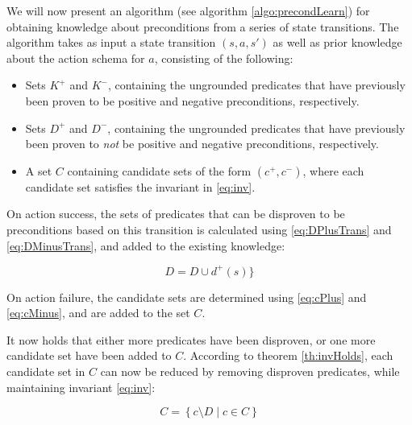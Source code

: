 \documentclass[../../Master.tex]{subfiles}
\begin{document}
    
We will now present an algorithm (see algorithm \ref{algo:precondLearn}) for obtaining knowledge about preconditions from a series of state transitions. The algorithm takes as input a state transition $(s, a, s')$ as well as prior knowledge about the action schema for $a$, consisting of the following:

\begin{itemize}
    \item Sets $K^+$ and $K^-$, containing the ungrounded predicates that have previously been proven to be positive and negative preconditions, respectively.
    \item Sets $D^+$ and $D^-$, containing the ungrounded predicates that have previously been proven to \textit{not} be positive and negative preconditions, respectively.
    \item A set $C$ containing candidate sets of the form $\left(c^+, c^- \right)$, where each candidate set satisfies the invariant in \eqref{eq:inv}.
\end{itemize}

On action success, the sets of predicates that can be disproven to be preconditions based on this transition is calculated using \eqref{eq:DPlusTrans} and \eqref{eq:DMinusTrans}, and added to the existing knowledge:

\begin{equation*}
    D = D \cup d^+(s)\}
\end{equation*}

%

On action failure, the candidate sets are determined using \eqref{eq:cPlus} and \eqref{eq:cMinus}, and are added to the set $C$.

It now holds that either more predicates have been disproven, or one more candidate set have been added to $C$. According to theorem \ref{th:invHolds}, each candidate set in $C$ can now be reduced by removing disproven predicates, while maintaining invariant \eqref{eq:inv}:

\begin{equation} \label{reduceCands}
    C = \left\{ c \setminus D \; | \; c \in C \right\}
\end{equation}
\end{document}
